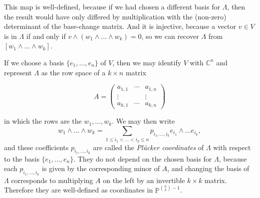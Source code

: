 \documentclass[12pt,a4paper]{amsart}
\theoremstyle{plain}
\theoremstyle{definition}
\theoremstyle{remark}
\begin{document}
This map is well-defined, because if we had chosen a different basis for $\Lambda$, then the result would have only differed by multiplication with the (non-zero) determinant of the base-change matrix.
And it is injective, because a vector $v\in V$ is in $\Lambda$ if and only if $v\wedge (w_{1}\wedge\ldots \wedge w_{k})=0$, so we can recover $\Lambda$ from $[w_{1}\wedge\ldots\wedge w_{k}]$.

If we choose a basis $\{ e_{1},\ldots,e_{n}\}$ of $V$, then we may identify $V$ with $\mathbb{C}^{n}$ and represent $\Lambda$ as the row space of a $k\times n$ matrix

\[ A=\begin{pmatrix}
    a_{1,1} & \cdots & a_{1,n} \\
    \vdots & & \vdots \\
    a_{k,1} & \cdots & a_{k,n}
\end{pmatrix} \]

in which the rows are the $w_{1},\ldots,w_{k}$.
We may then write
\[ w_{1}\wedge \ldots \wedge w_{k}=\sum_{1\leq i_{1}<\ldots<i_{k}\leq n} p_{i_{1},\ldots,i_{k}}e_{i_{1}}\wedge \ldots e_{i_{k}}, \]
and these coefficients $p_{i_{1},\ldots,i_{k}}$ are called the \textit{Plücker coordinates} of $\Lambda$ with respect to the basis $\{ e_{1},\ldots,e_{n}\}$.
They do not depend on the chosen basis for $\Lambda$, because each $p_{i_{1},\ldots,i_{k}}$ is given by the corresponding minor of $A$, and changing the basis of $\Lambda$ corresponds to multiplying $A$ on the left by an invertible $k\times k$ matrix.
Therefore they are well-defined as coordinates in $\mathbb{P}^{\binom{n}{k}-1}$.
\end{document}
